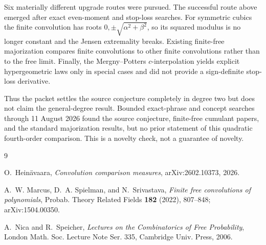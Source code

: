 \documentclass[11pt]{article}
\theoremstyle{remark}
\begin{document}
Six materially different upgrade routes were pursued.  The successful route
above emerged after exact even-moment and stop-loss searches.  For symmetric
cubics the finite convolution has roots $0,\pm\sqrt{\alpha^2+\beta^2}$,
so its squared modulus is no longer constant and the Jensen extremality
breaks.  Existing finite-free majorization compares finite convolutions to
other finite convolutions rather than to the free limit.  Finally, the
Mergny--Potters $c$-interpolation yields explicit hypergeometric laws only in
special cases and did not provide a sign-definite stop-loss derivative.

Thus the packet settles the source conjecture completely in degree two but
does not claim the general-degree result.  Bounded exact-phrase and concept
searches through 11 August 2026 found the source conjecture, finite-free
cumulant papers, and the standard majorization results, but no prior statement
of this quadratic fourth-order comparison.  This is a novelty check, not a
guarantee of novelty.

\begin{thebibliography}{9}

O.~Hein\"avaara,
\emph{Convolution comparison measures},
arXiv:2602.10373, 2026.

A.~W. Marcus, D.~A. Spielman, and N.~Srivastava,
\emph{Finite free convolutions of polynomials},
Probab. Theory Related Fields \textbf{182} (2022), 807--848;
arXiv:1504.00350.

A.~Nica and R.~Speicher,
\emph{Lectures on the Combinatorics of Free Probability},
London Math. Soc. Lecture Note Ser. 335, Cambridge Univ. Press, 2006.

\end{thebibliography}
\end{document}
